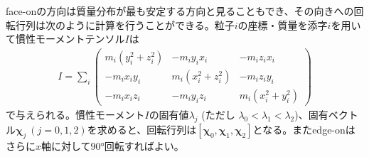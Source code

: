 face-onの方向は質量分布が最も安定する方向と見ることもでき、その向きへの回転行列は次のように計算を行うことができる。粒子$i$の座標・質量を添字$i$を用いて慣性モーメントテンソル$I$は
\begin{align}
	I = \sum_{i} \begin{pmatrix}
		m_i (y_i^2 + z_i^2) & -m_iy_ix_i & -m_iz_ix_i \\
		-m_i x_i y_i & m_i (x_i^2 + z_i^2) & -m_i z_iy_i \\
		-m_i x_i z_i & -m_i y_i z_i & m_i (x_i^2 + y_i^2)
	\end{pmatrix}
\end{align}
で与えられる。慣性モーメント$I$の固有値$\lambda_j$ (ただし $\lambda_0 < \lambda_1 < \lambda_2$)、固有ベクトル$\bm{\chi}_j \ (j = 0,1,2)$を求めると、回転行列は$[ \bm{\chi}_0, \bm{\chi}_1, \bm{\chi}_2 ]$となる。またedge-onはさらに$x$軸に対して$\ang{90}$回転すればよい。